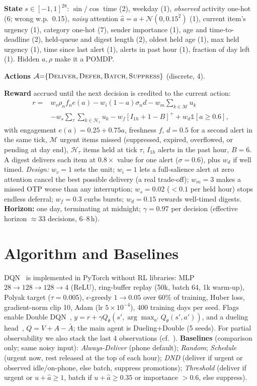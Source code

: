 \documentclass[conference,10pt]{IEEEtran}
\begin{document}
\textbf{State} $s\in[-1,1]^{28}$: $\sin/\cos$ time (2), weekday (1), \emph{observed} activity one-hot (6; wrong w.p.\ 0.15), \emph{noisy} attention $\hat a{=}a{+}\mathcal N(0,0.15^2)$ (1), current item's urgency (1), category one-hot (7), sender importance (1), age and time-to-deadline (2), held-queue and digest length (2), oldest held age (1), max held urgency (1), time since last alert (1), alerts in past hour (1), fraction of day left (1). Hidden $a,\rho$ make it a POMDP.

\textbf{Actions} $\mathcal A{=}\{\textsc{Deliver},\textsc{Defer},\textsc{Batch},\textsc{Suppress}\}$ (discrete, 4).

\textbf{Reward} accrued until the next decision is credited to the current action:
\begin{align*}
r ={}& w_v\rho_n f_n e(a) - w_i(1{-}a)\sigma_n d - w_m\!\textstyle\sum_{k\in\mathcal M}\!u_k\\
&- w_s\textstyle\sum_{\tau}\sum_{k\in\mathcal H_\tau}u_k - w_f[I_{1h}{+}1{-}B]^+ + w_d\mathbb 1[a{\ge}0.6],
\end{align*}
with engagement $e(a){=}0.25{+}0.75a$, freshness $f$, $d{=}0.5$ for a second alert in the same tick, $\mathcal M$ urgent items missed (suppressed, expired, overflowed, or pending at day end), $\mathcal H_\tau$ items held at tick $\tau$, $I_{1h}$ alerts in the past hour, $B{=}6$. A digest delivers each item at $0.8\times$ value for one alert ($\sigma{=}0.6$), plus $w_d$ if well timed. \emph{Design:} $w_v{=}1$ sets the unit; $w_i{=}1$ lets a full-salience alert at zero attention cancel the best possible delivery (a real trade-off); $w_m{=}3$ makes a missed OTP worse than any interruption; $w_s{=}0.02$ (${<}0.1$ per held hour) stops endless deferral; $w_f{=}0.3$ curbs bursts; $w_d{=}0.15$ rewards well-timed digests. \textbf{Horizon:} one day, terminating at midnight; $\gamma{=}0.97$ per decision (effective horizon ${\approx}33$ decisions, 6--8\,h).

\section{Algorithm and Baselines}
DQN~\cite{mnih2015human} is implemented in PyTorch without RL libraries: MLP $28{\to}128{\to}128{\to}4$ (ReLU), ring-buffer replay (50k, batch 64, 1k warm-up), Polyak target ($\tau{=}0.005$), $\epsilon$-greedy $1{\to}0.05$ over 60\% of training, Huber loss, gradient-norm clip 10, Adam (lr $5{\times}10^{-4}$), 400 training days per seed. Flags enable Double DQN~\cite{vanhasselt2016double}, $y{=}r{+}\gamma Q_{\bar\theta}(s',\arg\max_{a'}Q_\theta(s',a'))$, and a dueling head~\cite{wang2016dueling}, $Q{=}V{+}A{-}\bar A$; the main agent is Dueling+Double (5 seeds). For partial observability we also stack the last 4 observations (cf.~\cite{hausknecht2015drqn}).
\textbf{Baselines} (comparison only; same noisy input): \emph{Always-Deliver} (phone default); \emph{Random}; \emph{Schedule} (urgent now, rest released at the top of each hour); \emph{DND} (deliver if urgent or observed idle/on-phone, else batch, suppress promotions); \emph{Threshold} (deliver if urgent or $u{+}\hat a{\ge}1$, batch if $u{+}\hat a{\ge}0.35$ or importance ${>}0.6$, else suppress).
\end{document}
